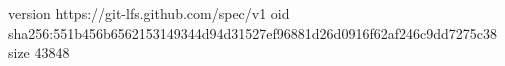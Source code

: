 version https://git-lfs.github.com/spec/v1
oid sha256:551b456b6562153149344d94d31527ef96881d26d0916f62af246c9dd7275c38
size 43848
